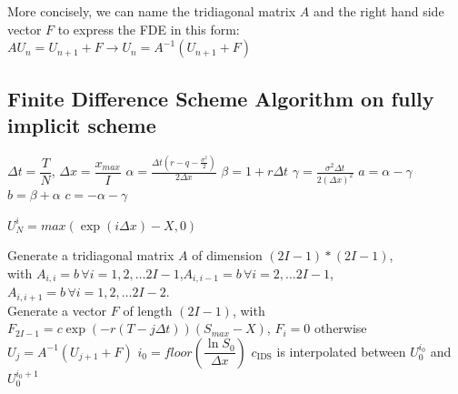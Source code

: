 More concisely, we can name the tridiagonal matrix $A$ and the right hand side vector $F$ to express the FDE in this form: $AU_{n} = U_{n+1} + F \to U_{n} = A^{-1}(U_{n+1} + F)$

\subsection{Finite Difference Scheme Algorithm on fully implicit scheme}

\begin{algorithm}[H]
	$\Delta t = \dfrac{T}{N}$, 
	$\Delta x = \dfrac{x_{max}}{I}$\;
	$\alpha = \frac{\Delta t(r - q - \frac{\sigma^{2}}{2})}{2\Delta x}$\;
	$\beta = 1+ r \Delta t$\;
	$\gamma = \frac{\sigma^{2}\Delta t}{2(\Delta x)^{2}}$\;
	$a = \alpha - \gamma$\;
	$b = \beta + \alpha$\;
	$c = -\alpha - \gamma$\;
	
	 {
		$U_{N}^{i} = max(\exp(i\Delta x) - X, 0)$\;
	}
	
	Generate a tridiagonal matrix $A$ of dimension $(2I-1) * (2I-1)$, \\
	with $A_{i,i} = b\, \forall i = 1, 2, \dots 2I-1$,$A_{i,i-1} = b\, \forall i = 2, \dots 2I-1$, $A_{i,i+1} = b\, \forall i = 1, 2, \dots 2I-2$.\\
	
	 {
		Generate a vector $F$ of length $(2I-1)$, with $F_{2I-1} = c\exp(-r(T-j \Delta t))(S_{max} - X)$, $F_{i} = 0$ otherwise\;
		$U_{j} = A^{-1} (U_{j+1} + F)$\;
	}
	$i_0 = floor \left (\dfrac{\ln{S_0}}{\Delta x} \right )$\;
	$c_{\text{IDS}}$ is interpolated between $U_{0}^{i_{0}}$ and $U_{0}^{i_{0}+1}$\;
	
\end{algorithm}

